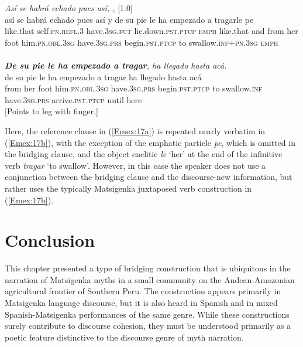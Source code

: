 \documentclass[output=paper]{LSP/langsci}
\begin{document}
\begin{exe}
\ex \label{Em17ab}
\begin{xlist}
\ex \label{Emex:17a}
\glt \textit{Así se habrá echado pues así,  \underline{.}} [1.0]\\
\gll así se habrá echado pues así y de su pie le ha empezado a tragarle pe \\
 like.that self\textsc{.pn.refl.3} have\textsc{.3sg.fut} lie.down\textsc{.pst.ptcp} \textsc{emph} like.that and from her foot him\textsc{.pn.obl.3sg} have\textsc{.3sg.prs} begin\textsc{.pst.ptcp} to swallow\textsc{.inf+pn.3sg} \textsc{emph}\\
\glt {}\\
\ex \label{Emex:17b}
\glt \textit{\textbf{De su pie le ha empezado a tragar}, ha llegado hasta acá.}\\
\gll de su pie le ha empezado a tragar ha llegado hasta acá\\     	      
    from her foot him\textsc{.pn.obl.3sg} have\textsc{.3sg.prs} begin\textsc{.pst.ptcp} to swallow\textsc{.inf} have\textsc{.3sg.prs} arrive\textsc{.pst.ptcp} until here\\
\glt {} [Points to leg with finger.] 
\end{xlist}
\end{exe}


Here, the reference clause in (\ref{Emex:17a}) is repeated nearly verbatim in (\ref{Emex:17b}), with the exception of the emphatic particle \textit{pe}, which is omitted in the bridging clause, and the object enclitic \textit{le} `her' at the end of the infinitive verb \textit{tragar} `to swallow'. However, in this case the speaker does not use a conjunction between the bridging clause and the discourse-new information, but rather uses the typically Matsigenka juxtaposed verb construction in (\ref{Emex:17b}).
%

\section{ Conclusion}
\label{Emconclus}
This chapter presented a type of bridging construction that is ubiquitous in the narration of Matsigenka myths in a small community on the Andean-Amazonian agricultural frontier of Southern Peru. The construction appears primarily in Matsigenka language discourse, but it is also heard in Spanish and in mixed Spanish-Matsigenka performances of the same genre. While these constructions surely contribute to discourse cohesion, they must be understood primarily as a poetic feature distinctive to the discourse genre of myth narration.
\end{document}
